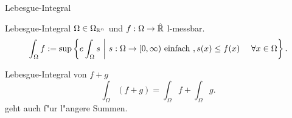 \documentclass[class=article, crop=false]{standalone}
\begin{document}
\begin{zettel}{Lebesgue-Integral}
\begin{flashcard}[lxiioiob]{Lebesgue-Integral}
	$\Omega \in  \Omega_{\mathbb{R}^n}$ und $f: \Omega \to \hat{\mathbb{R} }$ l-messbar.
	\[
		\int_{\Omega} f := \sup \set{e \int_{\Omega} s}{ s: \Omega \to  [0,\infty) \tx{einfach}, s(x) \leq f(x) \quad \forall x \in \Omega }
	.\]
\end{flashcard}

\begin{lemma}[Eigenschaften]
\end{lemma}

\begin{flashcard}[zfwuydfy]{Lebesgue-Integral von $f+g$}
	\[
		\int_{\Omega}(f + g) = \int_{\Omega} f + \int_{\Omega} g
	.\]
	geht auch f"ur l"angere Summen.
\end{flashcard}
\end{zettel}
\end{document}

